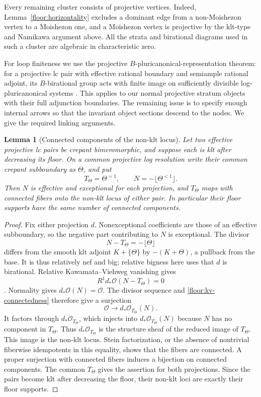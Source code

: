 \documentclass[11pt,letterpaper]{article}
\newcommand{\OO}{\mathcal{O}}
\newtheorem{lemma}[theorem]{Lemma}
\theoremstyle{definition}
\theoremstyle{remark}
\begin{document}
Every remaining cluster consists of projective vertices.  Indeed,
Lemma~\ref{floor:horizontality} excludes a dominant edge from a
non-Moishezon vertex to a Moishezon one, and a Moishezon vertex is
projective by the klt-type and Namikawa argument above.  All the
strata and birational diagrams used in such a cluster are
algebraic in characteristic zero.

For loop finiteness we use the projective
$B$-pluricanonical-representation theorem: for a projective lc
pair with effective rational boundary and semiample rational
adjoint, its $B$-birational group acts with finite image on
sufficiently divisible log-pluricanonical systems
\cite[Theorem~1.1]{FujinoGongyoPluricanonical}.  This applies to
our normal projective stratum objects with their full
adjunction boundaries.  The remaining issue is to specify enough
internal arrows so that the invariant object sections descend
to the nodes.  We give the required linking arguments.

\begin{lemma}[Connected components of the non-klt locus]
\label{floor:nklt-components}
Let two effective projective lc pairs be crepant bimeromorphic,
and suppose each is klt after decreasing its floor.  On a common
projective log resolution write their common crepant
subboundary as $\Theta$, and put
\[
 T_\Theta=\Theta^{=1},\qquad
 N=-\lfloor\Theta^{<1}\rfloor.
\]
Then $N$ is effective and exceptional for each projection, and
$T_\Theta$ maps with connected fibers onto the non-klt locus
of either pair.  In particular their floor supports have the
same number of connected components.
\end{lemma}

\begin{proof}
Fix either projection $d$.  Nonexceptional coefficients are
those of an effective subboundary, so the negative part
contributing to $N$ is exceptional.  The divisor
\[
 N-T_\Theta=-\lfloor\Theta\rfloor
\]
differs from the smooth klt adjoint $K+\{\Theta\}$ by
$-(K+\Theta)$, a pullback from the base.  It is thus relatively
nef and big; relative bigness here uses that $d$ is birational.
Relative Kawamata--Viehweg vanishing gives
\begin{equation}
 \label{floor:kv-connectedness}
 R^1d_*\OO(N-T_\Theta)=0
\end{equation}
\cite{KawamataViehwegVanishing}.  Normality gives
$d_*\OO(N)=\OO$.  The divisor sequence and
\eqref{floor:kv-connectedness} therefore give a surjection
\[
 \OO\longrightarrow d_*\OO_{T_\Theta}(N).
\]
It factors through $d_*\OO_{T_\Theta}$, which injects into
$d_*\OO_{T_\Theta}(N)$ because $N$ has no component in
$T_\Theta$.  Thus $d_*\OO_{T_\Theta}$ is the structure
sheaf of the reduced image of $T_\Theta$.  This image is
the non-klt locus.  Stein factorization, or the absence of
nontrivial fiberwise idempotents in this equality, shows
that the fibers are connected.  A proper surjection with
connected fibers induces a bijection on connected
components.  The common $T_\Theta$ gives the assertion
for both projections.  Since the pairs become klt after
decreasing the floor, their non-klt loci are exactly their
floor supports.
\end{proof}
\end{document}

